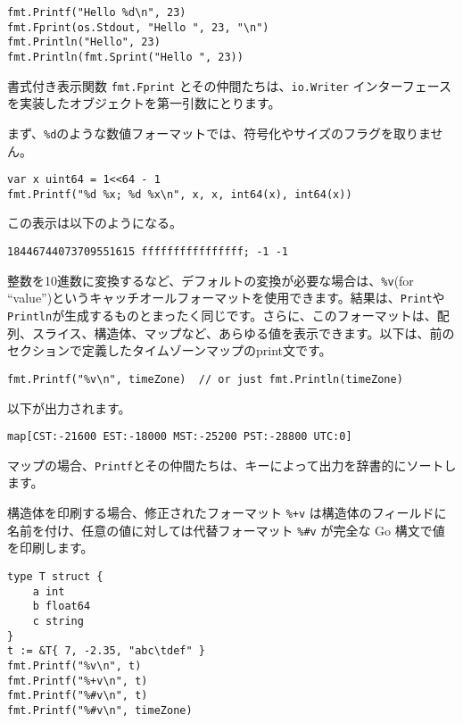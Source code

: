 \documentclass{jsarticle}
\begin{document}
\begin{lstlisting}[numbers=none]
fmt.Printf("Hello %d\n", 23)
fmt.Fprint(os.Stdout, "Hello ", 23, "\n")
fmt.Println("Hello", 23)
fmt.Println(fmt.Sprint("Hello ", 23))
\end{lstlisting}

書式付き表示関数 \texttt{fmt.Fprint}
とその仲間たちは、\texttt{io.Writer}
インターフェースを実装したオブジェクトを第一引数にとります。

まず、\texttt{\%d}のような数値フォーマットでは、符号化やサイズのフラグを取りません。

\begin{lstlisting}[numbers=none]
var x uint64 = 1<<64 - 1
fmt.Printf("%d %x; %d %x\n", x, x, int64(x), int64(x))
\end{lstlisting}

この表示は以下のようになる。

\begin{lstlisting}[numbers=none]
18446744073709551615 ffffffffffffffff; -1 -1
\end{lstlisting}

整数を10進数に変換するなど、デフォルトの変換が必要な場合は、\texttt{\%v}(for
``value'')というキャッチオールフォーマットを使用できます。結果は、\texttt{Print}や\texttt{Println}が生成するものとまったく同じです。さらに、このフォーマットは、配列、スライス、構造体、マップなど、あらゆる値を表示できます。以下は、前のセクションで定義したタイムゾーンマップのprint文です。

\begin{lstlisting}[numbers=none]
fmt.Printf("%v\n", timeZone)  // or just fmt.Println(timeZone)
\end{lstlisting}

以下が出力されます。

\begin{lstlisting}[numbers=none]
map[CST:-21600 EST:-18000 MST:-25200 PST:-28800 UTC:0]
\end{lstlisting}

マップの場合、\texttt{Printf}とその仲間たちは、キーによって出力を辞書的にソートします。

構造体を印刷する場合、修正されたフォーマット \texttt{\%+v}
は構造体のフィールドに名前を付け、任意の値に対しては代替フォーマット
\texttt{\%\#v} が完全な Go 構文で値を印刷します。

\begin{lstlisting}[numbers=none]
type T struct {
    a int
    b float64
    c string
}
t := &T{ 7, -2.35, "abc\tdef" }
fmt.Printf("%v\n", t)
fmt.Printf("%+v\n", t)
fmt.Printf("%#v\n", t)
fmt.Printf("%#v\n", timeZone)
\end{lstlisting}
\end{document}
